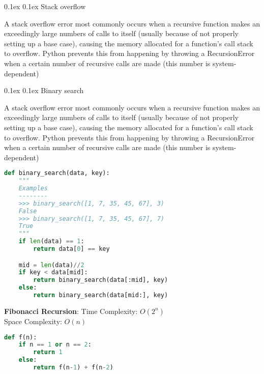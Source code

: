 \documentclass[8pt,landscape]{article}
\makeatletter
\renewcommand{\subsection}{\@startsection{subsection}{2}{0pt}%
    {0.1ex}%
    {0.1ex}%
    {\fontsize{8}{9}\bfseries\color{blue}}} %
\newcommand{\smalltext}[1]{%
  {\fontsize{8}{9}\selectfont\sloppy #1\par}%
}
\makeatother
\begin{document}
\fontsize{8}{9}\selectfont %
\pagestyle{empty}
\begin{multicols}{3}
\subsection{Stack overflow}
\smalltext{
A stack overflow error most commonly occurs when a recursive function makes an exceedingly large numbers of calls to itself (usually because of not properly setting up a base case), causing the memory allocated for a function’s call stack to overflow.
Python prevents this from happening by throwing a RecursionError when a certain number of recursive calls are made (this number is system-dependent)
}

\subsection{Binary search}
\smalltext{
A stack overflow error most commonly occurs when a recursive function makes an exceedingly large numbers of calls to itself (usually because of not properly setting up a base case), causing the memory allocated for a function’s call stack to overflow.
Python prevents this from happening by throwing a RecursionError when a certain number of recursive calls are made (this number is system-dependent)
}
\begin{lstlisting}[language=Python]
def binary_search(data, key):
    """
    Examples
    --------
    >>> binary_search([1, 7, 35, 45, 67], 3)
    False
    >>> binary_search([1, 7, 35, 45, 67], 7)
    True
    """
    if len(data) == 1:
        return data[0] == key

    mid = len(data)//2
    if key < data[mid]:
        return binary_search(data[:mid], key)
    else:
        return binary_search(data[mid:], key)
\end{lstlisting}
\textbf{Fibonacci Recursion}: Time Complexity: $O(2^n)$ \\
Space Complexity: $O(n)$ \\
\begin{lstlisting}[language=Python]
  def f(n):
    if n == 1 or n == 2:
        return 1
    else: 
        return f(n-1) + f(n-2)
\end{lstlisting}
    

\end{multicols}
\end{document}
